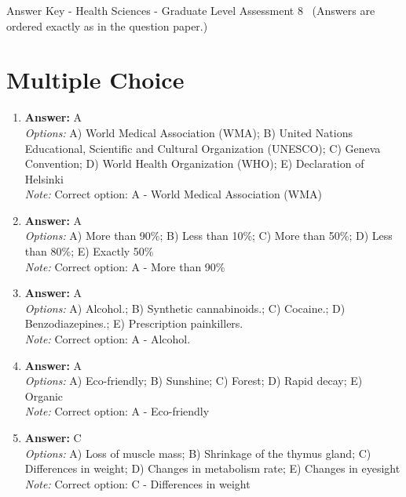 \documentclass[12pt]{article}
\begin{document}
\begin{center}
Answer Key - Health Sciences - Graduate Level Assessment 8 \
\small (Answers are ordered exactly as in the question paper.)
\end{center}

\section*{Multiple Choice}
\begin{enumerate}[label=\arabic*.]
\item \textbf{Answer:} A
\\ \textit{Options:} A) World Medical Association (WMA); B) United Nations Educational, Scientific and Cultural Organization (UNESCO); C) Geneva Convention; D) World Health Organization (WHO); E) Declaration of Helsinki
\\ \textit{Note:} Correct option: A - World Medical Association (WMA)
\item \textbf{Answer:} A
\\ \textit{Options:} A) More than 90\%; B) Less than 10\%; C) More than 50\%; D) Less than 80\%; E) Exactly 50\%
\\ \textit{Note:} Correct option: A - More than 90\%
\item \textbf{Answer:} A
\\ \textit{Options:} A) Alcohol.; B) Synthetic cannabinoids.; C) Cocaine.; D) Benzodiazepines.; E) Prescription painkillers.
\\ \textit{Note:} Correct option: A - Alcohol.
\item \textbf{Answer:} A
\\ \textit{Options:} A) Eco-friendly; B) Sunshine; C) Forest; D) Rapid decay; E) Organic
\\ \textit{Note:} Correct option: A - Eco-friendly
\item \textbf{Answer:} C
\\ \textit{Options:} A) Loss of muscle mass; B) Shrinkage of the thymus gland; C) Differences in weight; D) Changes in metabolism rate; E) Changes in eyesight
\\ \textit{Note:} Correct option: C - Differences in weight
\end{enumerate}
\end{document}
